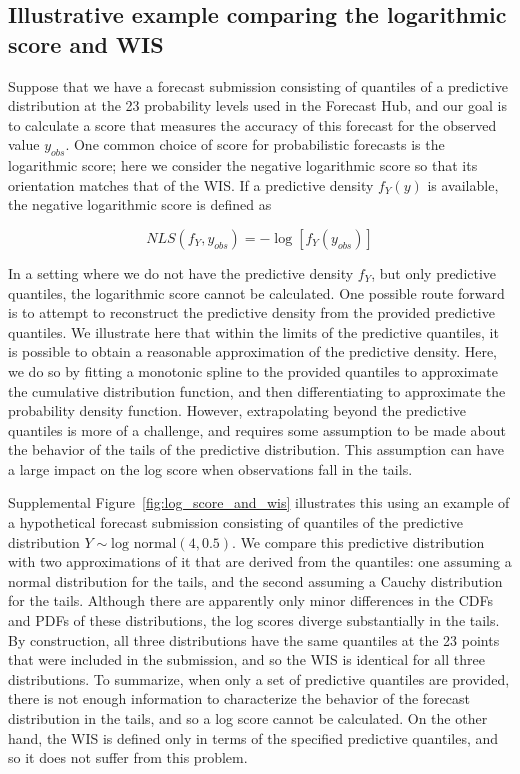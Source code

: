 \documentclass{article}
\begin{document}
\subsection{Illustrative example comparing the logarithmic score and WIS}
\label{subsec:log_score_wis_example}

Suppose that we have a forecast submission consisting of quantiles of a predictive distribution at the 23 probability levels used in the Forecast Hub, and our goal is to calculate a score that measures the accuracy of this forecast for the observed value $y_{obs}$. One common choice of score for probabilistic forecasts is the logarithmic score; here we consider the negative logarithmic score so that its orientation matches that of the WIS. If a predictive density $f_Y(y)$ is available, the negative logarithmic score is defined as

$$NLS(f_Y, y_{obs}) = -\log[f_Y(y_{obs})]$$

In a setting where we do not have the predictive density $f_Y$, but only predictive quantiles, the logarithmic score cannot be calculated. One possible route forward is to attempt to reconstruct the predictive density from the provided predictive quantiles. We illustrate here that within the limits of the predictive quantiles, it is possible to obtain a reasonable approximation of the predictive density. Here, we do so by fitting a monotonic spline to the provided quantiles to approximate the cumulative distribution function, and then differentiating to approximate the probability density function. However, extrapolating beyond the predictive quantiles is more of a challenge, and requires some assumption to be made about the behavior of the tails of the predictive distribution. This assumption can have a large impact on the log score when observations fall in the tails.

Supplemental Figure~\ref{fig:log_score_and_wis} illustrates this using an example of a hypothetical forecast submission consisting of quantiles of the predictive distribution $Y \sim \text{log normal}(4, 0.5)$. We compare this predictive distribution with two approximations of it that are derived from the quantiles: one assuming a normal distribution for the tails, and the second assuming a Cauchy distribution for the tails. Although there are apparently only minor differences in the CDFs and PDFs of these distributions, the log scores diverge substantially in the tails. By construction, all three distributions have the same quantiles at the 23 points that were included in the submission, and so the WIS is identical for all three distributions. To summarize, when only a set of predictive quantiles are provided, there is not enough information to characterize the behavior of the forecast distribution in the tails, and so a log score cannot be calculated. On the other hand, the WIS is defined only in terms of the specified predictive quantiles, and so it does not suffer from this problem.
\end{document}
